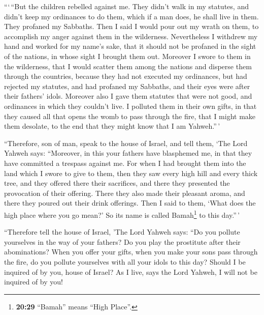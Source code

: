  ```\,``But the children rebelled against me. They didn't
walk in my statutes, and didn't keep my ordinances to do them, which if
a man does, he shall live in them. They profaned my Sabbaths. Then I
said I would pour out my wrath on them, to accomplish my anger against
them in the wilderness.  Nevertheless I withdrew my hand
and worked for my name's sake, that it should not be profaned in the
sight of the nations, in whose sight I brought them out. 
Moreover I swore to them in the wilderness, that I would scatter them
among the nations and disperse them through the countries,
 because they had not executed my ordinances, but had
rejected my statutes, and had profaned my Sabbaths, and their eyes were
after their fathers' idols.  Moreover also I gave them
statutes that were not good, and ordinances in which they couldn't live.
 I polluted them in their own gifts, in that they caused
all that opens the womb to pass through the fire, that I might make them
desolate, to the end that they might know that I am Yahweh.''\,'

 ``Therefore, son of man, speak to the house of Israel,
and tell them, `The Lord Yahweh says: ``Moreover, in this your fathers
have blasphemed me, in that they have committed a trespass against me.
 For when I had brought them into the land which I swore
to give to them, then they saw every high hill and every thick tree, and
they offered there their sacrifices, and there they presented the
provocation of their offering. There they also made their pleasant
aroma, and there they poured out their drink offerings. 
Then I said to them, `What does the high place where you go mean?' So
its name is called Bamah\footnote{\textbf{20:29} ``Bamah'' means ``High
  Place''.} to this day.''\,'

 ``Therefore tell the house of Israel, 'The Lord Yahweh
says: ``Do you pollute yourselves in the way of your fathers? Do you
play the prostitute after their abominations?  When you
offer your gifts, when you make your sons pass through the fire, do you
pollute yourselves with all your idols to this day? Should I be inquired
of by you, house of Israel? As I live, says the Lord Yahweh, I will not
be inquired of by you!


